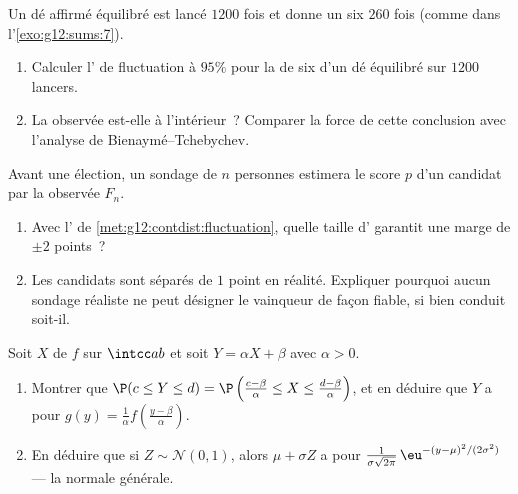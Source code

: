 \begin{exercise}[$\star\star$]\label{exo:g12:contdist:7}
Un dé affirmé équilibré est lancé $1200$ fois et donne un six $260$ fois
(comme dans l'\cref{exo:g12:sums:7}).
\begin{enumerate}
  \item Calculer l' de fluctuation à $95\%$ pour la  de
        six d'un dé équilibré sur $1200$ lancers.
  \item La  observée est-elle à l'intérieur~? Comparer la force de
        cette conclusion avec l'analyse de Bienaymé--Tchebychev.
\end{enumerate}
\end{exercise}

\begin{exercise}[$\star\star\star$]\label{exo:g12:contdist:8}
Avant une élection, un sondage de $n$ personnes estimera le score $p$ d'un
candidat par la  observée $F_n$.
\begin{enumerate}
  \item Avec l' de
        \cref{met:g12:contdist:fluctuation}, quelle taille d'
        garantit une marge de $\pm 2$ points~?
  \item Les candidats sont séparés de $1$ point en réalité. Expliquer
        pourquoi aucun sondage réaliste ne peut désigner le vainqueur de
        façon fiable, si bien conduit soit-il.
\end{enumerate}
\end{exercise}

\begin{exercise}[$\star\star\star$]\label{exo:g12:contdist:9}
Soit $X$ de  $f$ sur $\intcc ab$ et soit
$Y = \alpha X + \beta$ avec $\alpha > 0$.
\begin{enumerate}
  \item Montrer que $\P(c \leq Y \leq d)
        = \P\left(\frac{c - \beta}{\alpha} \leq X \leq
        \frac{d-\beta}{\alpha}\right)$, et en déduire que $Y$ a pour
        $g(y) = \frac{1}{\alpha} f\left(\frac{y - \beta}{\alpha}\right)$.
  \item En déduire que si $Z \sim \mathcal N(0,1)$, alors
        $\mu + \sigma Z$ a pour 
        $\frac{1}{\sigma\sqrt{2\pi}}\,
        \eu^{-(y - \mu)^2/(2\sigma^2)}$ --- la  normale générale.
\end{enumerate}
\end{exercise}

